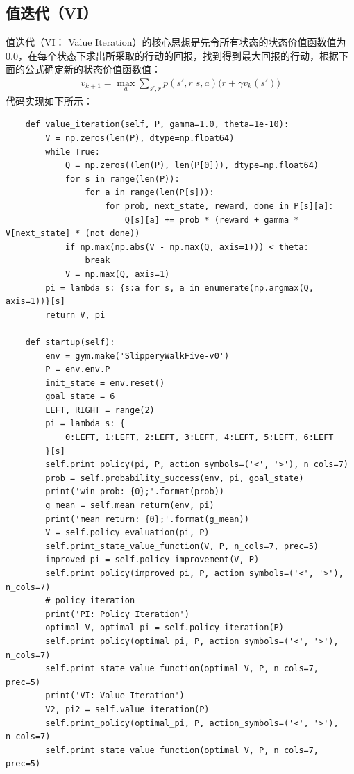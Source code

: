 \subsection{值迭代（VI）}
值迭代（VI： Value Iteration）的核心思想是先令所有状态的状态价值函数值为0.0，在每个状态下求出所采取的行动的回报，找到得到最大回报的行动，根据下面的公式确定新的状态价值函数值：
\begin{equation}
\begin{aligned}
    v_{k+1}=\max_{a} \sum_{s',r} p(s', r | s, a)\bigg( r + \gamma v_{k}(s') \bigg)
\end{aligned}
\label{chp001-value-iteration-formula}
\end{equation}
代码实现如下所示：
\begin{lstlisting}
    def value_iteration(self, P, gamma=1.0, theta=1e-10):
        V = np.zeros(len(P), dtype=np.float64)
        while True:
            Q = np.zeros((len(P), len(P[0])), dtype=np.float64)
            for s in range(len(P)):
                for a in range(len(P[s])):
                    for prob, next_state, reward, done in P[s][a]:
                        Q[s][a] += prob * (reward + gamma * V[next_state] * (not done))
            if np.max(np.abs(V - np.max(Q, axis=1))) < theta:
                break
            V = np.max(Q, axis=1)
        pi = lambda s: {s:a for s, a in enumerate(np.argmax(Q, axis=1))}[s]
        return V, pi

    def startup(self):
        env = gym.make('SlipperyWalkFive-v0')
        P = env.env.P
        init_state = env.reset()
        goal_state = 6
        LEFT, RIGHT = range(2)
        pi = lambda s: {
            0:LEFT, 1:LEFT, 2:LEFT, 3:LEFT, 4:LEFT, 5:LEFT, 6:LEFT
        }[s]
        self.print_policy(pi, P, action_symbols=('<', '>'), n_cols=7)
        prob = self.probability_success(env, pi, goal_state)
        print('win prob: {0};'.format(prob))
        g_mean = self.mean_return(env, pi)
        print('mean return: {0};'.format(g_mean))
        V = self.policy_evaluation(pi, P)
        self.print_state_value_function(V, P, n_cols=7, prec=5)
        improved_pi = self.policy_improvement(V, P)
        self.print_policy(improved_pi, P, action_symbols=('<', '>'), n_cols=7)
        # policy iteration
        print('PI: Policy Iteration')
        optimal_V, optimal_pi = self.policy_iteration(P)
        self.print_policy(optimal_pi, P, action_symbols=('<', '>'), n_cols=7)
        self.print_state_value_function(optimal_V, P, n_cols=7, prec=5)
        print('VI: Value Iteration')
        V2, pi2 = self.value_iteration(P)
        self.print_policy(optimal_pi, P, action_symbols=('<', '>'), n_cols=7)
        self.print_state_value_function(optimal_V, P, n_cols=7, prec=5)
\end{lstlisting}
